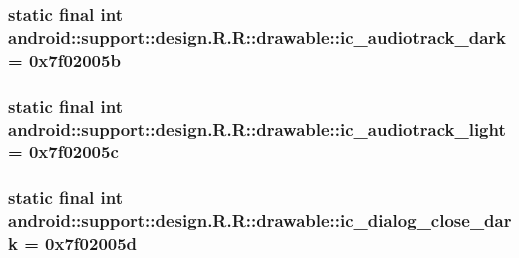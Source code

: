 \hypertarget{classandroid_1_1support_1_1design_1_1_r_1_1drawable_9d5e375b189c528c0d34092614f1ceec}{
\subsubsection[{ic\_\-audiotrack\_\-dark}]{\setlength{\rightskip}{0pt plus 5cm}static final int android::support::design.R.R::drawable::ic\_\-audiotrack\_\-dark = 0x7f02005b}}
\label{classandroid_1_1support_1_1design_1_1_r_1_1drawable_9d5e375b189c528c0d34092614f1ceec}


\hypertarget{classandroid_1_1support_1_1design_1_1_r_1_1drawable_0fddf5c44bf9419c6f8be9bfc99f146c}{
\subsubsection[{ic\_\-audiotrack\_\-light}]{\setlength{\rightskip}{0pt plus 5cm}static final int android::support::design.R.R::drawable::ic\_\-audiotrack\_\-light = 0x7f02005c}}
\label{classandroid_1_1support_1_1design_1_1_r_1_1drawable_0fddf5c44bf9419c6f8be9bfc99f146c}


\hypertarget{classandroid_1_1support_1_1design_1_1_r_1_1drawable_6732071f9936b00484460cfc6f21af4e}{
\subsubsection[{ic\_\-dialog\_\-close\_\-dark}]{\setlength{\rightskip}{0pt plus 5cm}static final int android::support::design.R.R::drawable::ic\_\-dialog\_\-close\_\-dark = 0x7f02005d}}
\label{classandroid_1_1support_1_1design_1_1_r_1_1drawable_6732071f9936b00484460cfc6f21af4e}


